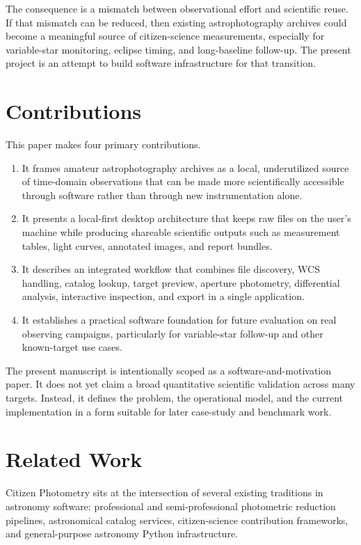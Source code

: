 \documentclass[modern]{aastex701}
\begin{document}
The consequence is a mismatch between observational effort and scientific reuse. If that mismatch can be reduced, then existing astrophotography archives could become a meaningful source of citizen-science measurements, especially for variable-star monitoring, eclipse timing, and long-baseline follow-up. The present project is an attempt to build software infrastructure for that transition.

\section{Contributions}\label{sec:contributions}

This paper makes four primary contributions.

\begin{enumerate}
\item It frames amateur astrophotography archives as a local, underutilized source of time-domain observations that can be made more scientifically accessible through software rather than through new instrumentation alone.
\item It presents a local-first desktop architecture that keeps raw files on the user's machine while producing shareable scientific outputs such as measurement tables, light curves, annotated images, and report bundles.
\item It describes an integrated workflow that combines file discovery, WCS handling, catalog lookup, target preview, aperture photometry, differential analysis, interactive inspection, and export in a single application.
\item It establishes a practical software foundation for future evaluation on real observing campaigns, particularly for variable-star follow-up and other known-target use cases.
\end{enumerate}

The present manuscript is intentionally scoped as a software-and-motivation paper. It does not yet claim a broad quantitative scientific validation across many targets. Instead, it defines the problem, the operational model, and the current implementation in a form suitable for later case-study and benchmark work.

\section{Related Work}\label{sec:related}

Citizen Photometry sits at the intersection of several existing traditions in astronomy software: professional and semi-professional photometric reduction pipelines, astronomical catalog services, citizen-science contribution frameworks, and general-purpose astronomy Python infrastructure.
\end{document}
